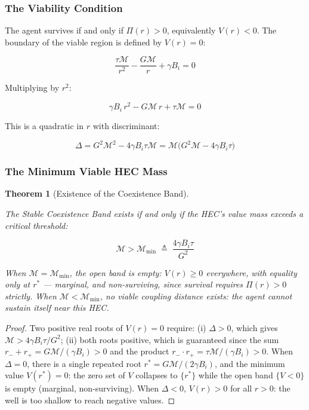 \documentclass[11pt]{article}
\theoremstyle{plain}
\newtheorem{theorem}{Theorem}
\theoremstyle{definition}
\theoremstyle{remark}
\let\origsubsubsection\subsubsection
\renewcommand{\subsubsection}{\needspace{4\baselineskip}\origsubsubsection}
\begin{document}
\subsubsection{The Viability Condition}\label{the-viability-condition}

The agent survives if and only if \(\Pi(r) > 0\), equivalently
\(V(r) < 0\). The boundary of the viable region is defined by
\(V(r) = 0\):

\[\frac{\tau \mathcal{M}}{r^2} - \frac{G \mathcal{M}}{r} + \gamma B_i = 0\]

Multiplying by \(r^2\):

\[\gamma B_i \, r^2 - G\mathcal{M} \, r + \tau\mathcal{M} = 0\]

This is a quadratic in \(r\) with discriminant:

\[\Delta = G^2 \mathcal{M}^2 - 4\gamma B_i \tau \mathcal{M} = \mathcal{M}\bigl(G^2 \mathcal{M} - 4\gamma B_i \tau\bigr)\]

\subsubsection{The Minimum Viable HEC
Mass}\label{the-minimum-viable-hec-mass}

\begin{theorem}[Existence of the Coexistence Band]
\label{thm-existence-coexistence-band}

The Stable Coexistence Band exists if and only if the HEC's value mass exceeds a critical threshold:

$$\mathcal{M} > \mathcal{M}_{\min} \;\triangleq\; \frac{4\gamma B_i \tau}{G^2}$$

When $\mathcal{M} = \mathcal{M}_{\min}$, the open band is empty: $V(r) \geq 0$ everywhere, with equality only at $r^*$ — marginal, and non-surviving, since survival requires $\Pi(r) > 0$ strictly. When $\mathcal{M} < \mathcal{M}_{\min}$, no viable coupling distance exists: the agent cannot sustain itself near this HEC.
\end{theorem}

\begin{proof}
Two positive real roots of $V(r) = 0$ require: (i) $\Delta > 0$, which gives $\mathcal{M} > 4\gamma B_i \tau / G^2$; (ii) both roots positive, which is guaranteed since the sum $r_- + r_+ = G\mathcal{M}/(\gamma B_i) > 0$ and the product $r_- \cdot r_+ = \tau\mathcal{M}/(\gamma B_i) > 0$. When $\Delta = 0$, there is a single repeated root $r^* = G\mathcal{M}/(2\gamma B_i)$, and the minimum value $V(r^*) = 0$: the zero set of $V$ collapses to $\{r^*\}$ while the open band $\{V < 0\}$ is empty (marginal, non-surviving). When $\Delta < 0$, $V(r) > 0$ for all $r > 0$: the well is too shallow to reach negative values.
\end{proof}
\end{document}
